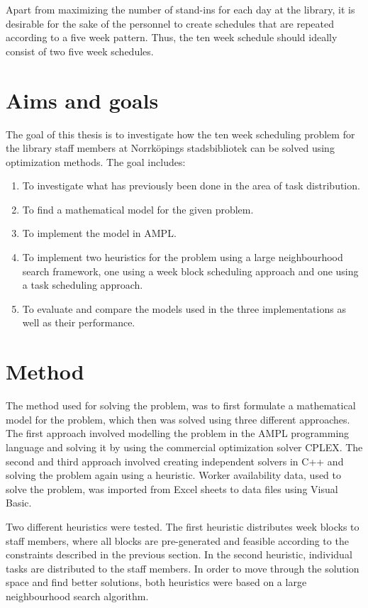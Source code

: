Apart from maximizing the number of stand-ins for each day at the library, it is desirable for the sake of the personnel to create schedules that are repeated according to a five week pattern. Thus, the ten week schedule should ideally consist of two five week schedules.

\section{Aims and goals}

The goal of this thesis is to investigate how the ten week scheduling problem for the library staff members at Norrköpings stadsbibliotek can be solved using optimization methods. The goal includes:

\begin{enumerate}
\item To investigate what has previously been done in the area of task distribution.
\item To find a mathematical model for the given problem.
\item To implement the model in AMPL.
\item To implement two heuristics for the problem using a large neighbourhood search framework, one using a week block scheduling approach and one using a task scheduling approach.
\item To evaluate and compare the models used in the three implementations as well as their performance.
\end{enumerate}


\section{Method}
The method used for solving the problem, was to first formulate a mathematical model for the problem, which then was solved using three different approaches. The first approach involved modelling the problem in the AMPL programming language and solving it by using the commercial optimization solver CPLEX. The second and third approach involved creating independent solvers in C++ and solving the problem again using a heuristic. Worker availability data, used to solve the problem, was imported from Excel sheets to data files using Visual Basic.

Two different heuristics were tested. The first heuristic distributes week blocks to staff members, where all blocks are pre-generated and feasible according to the constraints described in the previous section. In the second heuristic, individual tasks are distributed to the staff members. In order to move through the solution space and find better solutions, both heuristics were based on a large neighbourhood search algorithm.

